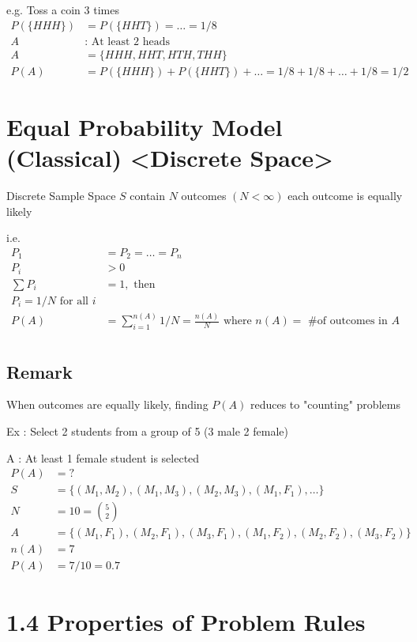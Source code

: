 e.g. Toss a coin 3 times
\begin{align*}
    P( \{ HHH \} ) &= P( \{ HHT \} ) = \ldots = 1/8 \\
    A &: \text{ At least 2 heads} \\
    A &= \{ HHH, HHT, HTH, THH \} \\
    P(A) &= P( \{ HHH \} ) + P( \{ HHT \} ) + \ldots = 1/8 + 1/8 + \ldots + 1/8 = 1/2
\end{align*}

\section*{Equal Probability Model (Classical) <Discrete Space>}
Discrete Sample Space $S$ contain $N$ outcomes $(N < \infty)$ each outcome is equally likely

i.e.
\begin{align*}
    P_1 &= P_2 = \ldots = P_n \\
    P_i &> 0 \\
    \sum P_i &= 1, \text{ then } \\
    P_i = 1/N \text{ for all } i \\
P(A) &= \sum\limits_{i=1}^{n(A)} 1/N = \frac{n(A)}{N} \text{ where } n(A) = \text{ \# of outcomes in } A \\
\end{align*}

\subsection*{Remark}
When outcomes are equally likely, finding $P(A)$ reduces to "counting" problems

Ex : Select 2 students from a group of 5 (3 male 2 female)

A : At least 1 female student is selected
\begin{align*}
    P(A) &= ? \\
    S &= \{ (M_1, M_2), (M_1, M_3), (M_2, M_3), (M_1, F_1), \ldots \} \\
    N &= 10 = \binom{5}{2} \\
    A &= \{ (M_1, F_1), (M_2, F_1), (M_3, F_1), (M_1, F_2), (M_2, F_2), (M_3, F_2) \} \\
    n(A) &= 7 \\
    P(A) &= 7/10 = 0.7
\end{align*}

\section*{1.4 Properties of Problem Rules}


